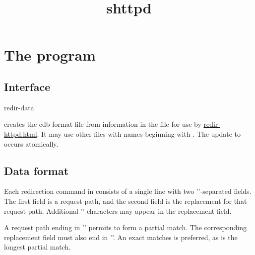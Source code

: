 \documentclass{book}
\title{shttpd}
\begin{document}
\section{The  program}

\subsection{Interface}
\begin{code}
  redir-data
\end{code}

 creates the cdb-format file  from information in
the file  for use by \href{\cmd{redir-httpd}}{redir-httpd.html}.  It
may use other files with names beginning with .  The update to
 occurs atomically.

\subsection{Data format}

Each redirection command in  consists of a single line with two
'\cmd{\#}'-separated fields.  The first field is a request path, and the second
field is the replacement for that request path.  Additional '\cmd{\#}'
characters may appear in the replacement field.

A request path ending in '\cmd{/}' permits  to form a partial
match.  The corresponding replacement field must also end in '\cmd{/}'.
An exact matches is preferred, as is the longest partial match.
\end{document}
